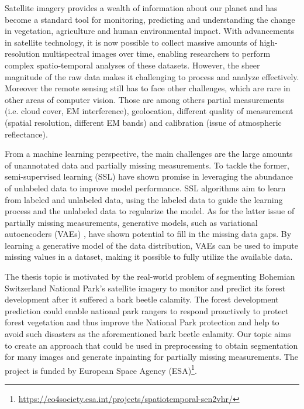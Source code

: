 

Satellite imagery provides a wealth of information about our planet and has become a standard tool for monitoring, predicting and understanding 
the change in vegetation, agriculture and human environmental impact. With advancements in satellite technology, it is now possible to collect
massive amounts of high-resolution multispectral images over time, enabling researchers to perform complex spatio-temporal analyses of these 
datasets. However, the sheer magnitude of the raw data makes it challenging to process and analyze effectively. Moreover the remote sensing 
still has to face other challenges, which are rare in other areas of computer vision. Those are among others partial measurements 
(i.e. cloud cover, EM interference), geolocation, different quality of measurement (spatial resolution, different EM bands) and 
calibration (issue of atmospheric reflectance).

From a machine learning perspective, the main challenges are the large amounts of unannotated data and partially missing measurements.
To tackle the former, semi-supervised learning \cite{ssl-book-2006} (SSL) have shown promise in leveraging the abundance of unlabeled
data to improve model performance. SSL algorithms aim to learn from labeled and unlabeled data, using the labeled data to guide the 
learning process and the unlabeled data to regularize the model. As for the latter issue of partially missing measurements, generative
models, such as variational autoencoders (VAEs) \cite{intro-vae-2019}, have shown potential to fill in the missing data gaps. 
By learning a generative model of the data distribution, VAEs can be used to impute missing values in a dataset, making it possible to 
fully utilize the available data.

The thesis topic is motivated by the real-world problem of segmenting Bohemian Switzerland National Park's satellite imagery to monitor and predict 
its forest development after it suffered a bark beetle calamity. The forest development prediction could enable national park rangers to respond 
proactively to protect forest vegetation and thus improve the National Park protection and help to avoid such disasters as the aforementioned bark beetle calamity.
Our topic aims to create an approach that could be used in preprocessing to obtain segmentation for many images and generate inpainting for partially
missing measurements. The project is funded by European Space Agency (ESA)\footnote[1]{\url{https://eo4society.esa.int/projects/spatiotemporal-sen2vhr/}}.

